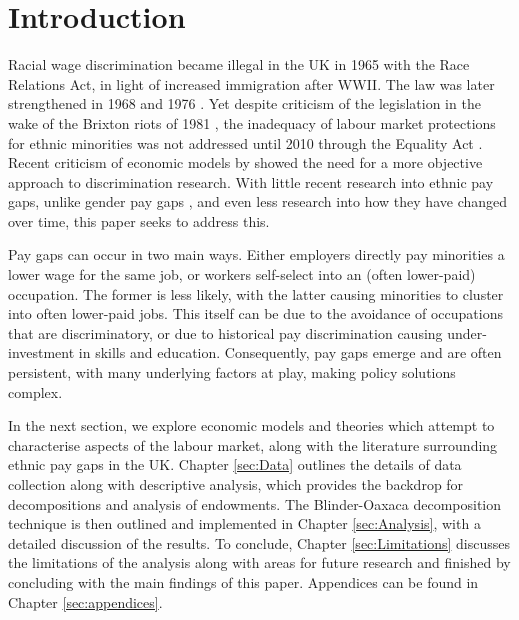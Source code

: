 \documentclass[class=article, crop=false]{standalone}
\begin{document}
\section{Introduction}
\label{sec:introduction}
Racial wage discrimination became illegal in the UK in 1965 \citep{GOV} with the Race Relations Act, in light of increased immigration after WWII. The law was later strengthened in 1968 and 1976 \citep{Sooben}. Yet despite criticism of the legislation in the wake of the Brixton riots of 1981 \citep{Solomos}, the inadequacy of labour market protections for ethnic minorities was not addressed until 2010 through the Equality Act \citep{Brown}. Recent criticism of economic models by \citet{Spriggs} showed the need for a more objective approach to discrimination research. With little recent research into ethnic pay gaps, unlike gender pay gaps \citep{Metcalf}, and even less research into how they have changed over time, this paper seeks to address this.

Pay gaps can occur in two main ways. Either employers directly pay minorities a lower wage for the same job, or workers self-select into an (often lower-paid) occupation. The former is less likely, with the latter causing minorities to cluster into often lower-paid jobs. This itself can be due to the avoidance of occupations that are discriminatory, or due to historical pay discrimination causing under-investment in skills and education. Consequently, pay gaps emerge and are often persistent, with many underlying factors at play, making policy solutions complex.

In the next section, we explore economic models and theories which attempt to characterise aspects of the labour market, along with the literature surrounding ethnic pay gaps in the UK. Chapter \ref{sec:Data} outlines the details of data collection along with descriptive analysis, which provides the backdrop for decompositions and analysis of endowments. The Blinder-Oaxaca decomposition technique is then outlined and implemented in Chapter \ref{sec:Analysis}, with a detailed discussion of the results. To conclude, Chapter \ref{sec:Limitations} discusses the limitations of the analysis along with areas for future research and finished by concluding with the main findings of this paper. Appendices can be found in Chapter \ref{sec:appendices}.

\begin{comment}
Amanda's meeting notes:
Change for occup and not industry. 
Similar for industry

Possibly higher status jobs are less racist. But probs not. 

Racist attitudes cause barriers to entry. Or like a tax on employment in a certain activity so pushed away.

Link with models of the Labour Market fit in with the results. 

Stratification researchers get annoyed when we model racism. If racism is structural then there's a lot of endogeniety. 
\end{comment}

\ifstandalone

\fi
\end{document}
